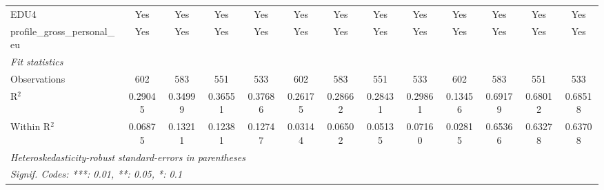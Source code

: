 \begin{tabular}{lcccccccccccc}
   EDU4                                      & Yes      & Yes      & Yes      & Yes      & Yes           & Yes      & Yes      & Yes      & Yes      & Yes      & Yes            & Yes\\  
   profile\_gross\_personal\_eu              & Yes      & Yes      & Yes      & Yes      & Yes           & Yes      & Yes      & Yes      & Yes      & Yes      & Yes            & Yes\\  
   \midrule
   \emph{Fit statistics}\\
   Observations                              & 602      & 583      & 551      & 533      & 602           & 583      & 551      & 533      & 602      & 583      & 551            & 533\\  
   R$^2$                                     & 0.29045  & 0.34999  & 0.36551  & 0.37686  & 0.26175       & 0.28662  & 0.28431  & 0.29861  & 0.13456  & 0.69179  & 0.68012        & 0.68518\\  
   Within R$^2$                              & 0.06875  & 0.13211  & 0.12381  & 0.12747  & 0.03144       & 0.06502  & 0.05135  & 0.07160  & 0.02815  & 0.65366  & 0.63278        & 0.63708\\  
   \midrule \midrule
   \multicolumn{13}{l}{\emph{Heteroskedasticity-robust standard-errors in parentheses}}\\
   \multicolumn{13}{l}{\emph{Signif. Codes: ***: 0.01, **: 0.05, *: 0.1}}\\
\end{tabular}
\par\endgroup


